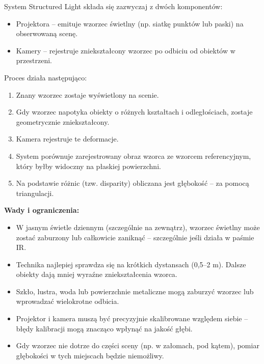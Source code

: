 \documentclass[magisterska]{pracadypl}
\begin{document}
\bigskip

System Structured Light składa się zazwyczaj z dwóch komponentów:

\begin{itemize}
  \item Projektora – emituje wzorzec świetlny (np. siatkę punktów lub paski) na obserwowaną scenę.

  \item Kamery – rejestruje zniekształcony wzorzec po odbiciu od obiektów w przestrzeni.
\end{itemize}

Proces działa następująco:

\begin{enumerate}
  \item Znany wzorzec zostaje wyświetlony na scenie.

  \item Gdy wzorzec napotyka obiekty o różnych kształtach i odległościach, zostaje geometrycznie zniekształcony.

  \item Kamera rejestruje te deformacje.

  \item System porównuje zarejestrowany obraz wzorca ze wzorcem referencyjnym, który byłby widoczny na płaskiej powierzchni.

  \item Na podstawie różnic (tzw. disparity) obliczana jest głębokość – za pomocą triangulacji.
\end{enumerate}

\begin{minipage}[t]{\textwidth}
\textbf{Wady i ograniczenia:}
\begin{itemize}
  \item W jasnym świetle dziennym (szczególnie na zewnątrz), wzorzec świetlny może zostać zaburzony lub całkowicie zaniknąć – szczególnie jeśli działa w paśmie IR.

  \item Technika najlepiej sprawdza się na krótkich dystansach (0,5–2 m). Dalsze obiekty dają mniej wyraźne zniekształcenia wzorca.

  \item Szkło, lustra, woda lub powierzchnie metaliczne mogą zaburzyć wzorzec lub wprowadzać wielokrotne odbicia.

  \item Projektor i kamera muszą być precyzyjnie skalibrowane względem siebie – błędy kalibracji mogą znacząco wpłynąć na jakość głębi.

  \item Gdy wzorzec nie dotrze do części sceny (np. w załomach, pod kątem), pomiar głębokości w tych miejscach będzie niemożliwy.
\end{itemize}
\end{minipage}
\end{document}
